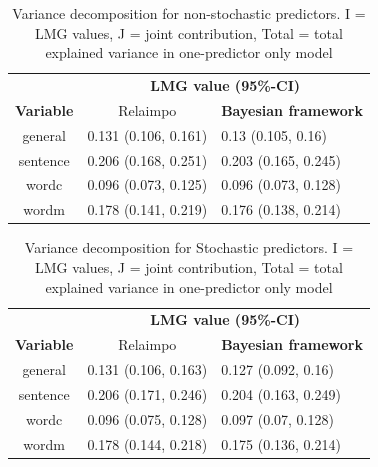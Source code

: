 \documentclass[11pt,a4paper,twoside]{book}
\begin{document}
\begin{table}[h]
\caption{Variance decomposition for non-stochastic predictors. I = LMG values, J = joint contribution, Total = total explained variance in one-predictor only model}
\centering
\begin{tabular}{cll}
   \toprule
   &\multicolumn{2}{c}{\textbf{LMG value (95\%-CI)}} \\
 \textbf{Variable} & \multicolumn{1}{c}{Relaimpo} & \textbf{Bayesian framework}  \\
  \hline
general & 0.131 (0.106, 0.161)  & 0.13 (0.105, 0.16)  \\ 
sentence & 0.206 (0.168, 0.251)  & 0.203 (0.165, 0.245)   \\ 
wordc & 0.096 (0.073, 0.125)  & 0.096 (0.073, 0.128)  \\ 
wordm & 0.178 (0.141, 0.219) & 0.176 (0.138, 0.214)  \\ 
   \bottomrule
\end{tabular}
\label{tbl:empirical.relaimp.comp}
\end{table}





\begin{table}[h]
\caption{Variance decomposition for Stochastic predictors. I = LMG values, J = joint contribution, Total = total explained variance in one-predictor only model}
\centering
\begin{tabular}{cll}
   \toprule
   &\multicolumn{2}{c}{\textbf{LMG value (95\%-CI)}} \\
 \textbf{Variable} & \multicolumn{1}{c}{Relaimpo} & \textbf{Bayesian framework}  \\
  \hline
general & 0.131 (0.106, 0.163)  &  0.127 (0.092, 0.16)  \\ 
sentence & 0.206 (0.171, 0.246)  &  0.204 (0.163, 0.249)   \\ 
wordc & 0.096 (0.075, 0.128)  &  0.097 (0.07, 0.128)  \\ 
wordm & 0.178 (0.144, 0.218) &  0.175 (0.136, 0.214) \\ 
   \bottomrule
\end{tabular}
\label{tbl:empirical.relaimp.comp.stoch}
\end{table}
 

\end{document}
